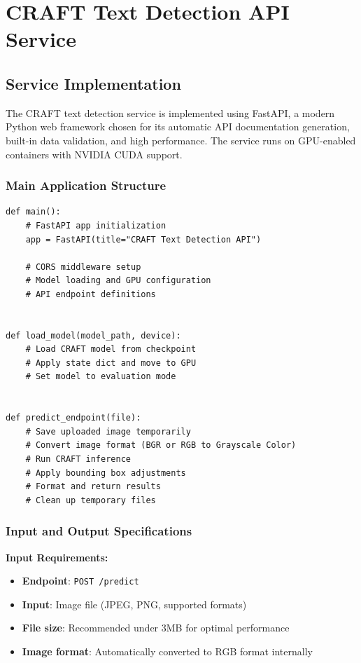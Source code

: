 {\section{CRAFT Text Detection API Service}
\label{sec:craft-api}

\subsection{Service Implementation}
\label{subsec:craft-implementation}

The CRAFT text detection service is implemented using FastAPI, a modern Python web framework chosen for its automatic API documentation generation, built-in data validation, and high performance. The service runs on GPU-enabled containers with NVIDIA CUDA support.

\subsubsection*{Main Application Structure}

\begin{verbatim}
def main():
    # FastAPI app initialization
    app = FastAPI(title="CRAFT Text Detection API")
    
    # CORS middleware setup
    # Model loading and GPU configuration
    # API endpoint definitions


def load_model(model_path, device):
    # Load CRAFT model from checkpoint
    # Apply state dict and move to GPU
    # Set model to evaluation mode


def predict_endpoint(file):
    # Save uploaded image temporarily
    # Convert image format (BGR or RGB to Grayscale Color)
    # Run CRAFT inference
    # Apply bounding box adjustments
    # Format and return results
    # Clean up temporary files

\end{verbatim}

\subsubsection*{Input and Output Specifications}

\textbf{Input Requirements:}
\begin{itemize}
\item \textbf{Endpoint}: \texttt{POST /predict}
\item \textbf{Input}: Image file (JPEG, PNG, supported formats)
\item \textbf{File size}: Recommended under 3MB for optimal performance
\item \textbf{Image format}: Automatically converted to RGB format internally
\end{itemize}

}

